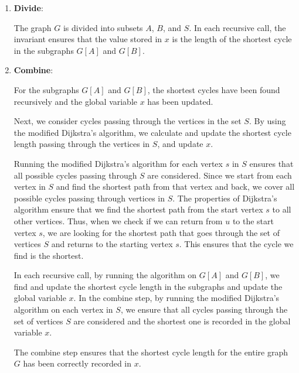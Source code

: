 \documentclass[12pt]{article}
\begin{document}
        \begin{enumerate}
            \item \textbf{Divide}:
            
            The graph \( G \) is divided into subsets \( A \), \( B \), and \( S \). In each recursive call, the invariant ensures that the value stored in \( x \) is the length of the shortest cycle in the subgraphs \( G[A] \) and \( G[B] \).

            \item \textbf{Combine}:
            
            For the subgraphs \( G[A] \) and \( G[B] \), the shortest cycles have been found recursively and the global variable \( x \) has been updated.
            
            Next, we consider cycles passing through the vertices in the set \( S \). By using the modified Dijkstra's algorithm, we calculate and update the shortest cycle length passing through the vertices in \( S \), and update \( x \).
            
            Running the modified Dijkstra's algorithm for each vertex \( s \) in \( S \) ensures that all possible cycles passing through \( S \) are considered. Since we start from each vertex in \( S \) and find the shortest path from that vertex and back, we cover all possible cycles passing through vertices in \( S \). The properties of Dijkstra's algorithm ensure that we find the shortest path from the start vertex \( s \) to all other vertices. Thus, when we check if we can return from \( u \) to the start vertex \( s \), we are looking for the shortest path that goes through the set of vertices \( S \) and returns to the starting vertex \( s \). This ensures that the cycle we find is the shortest.
            
            In each recursive call, by running the algorithm on \( G[A] \) and \( G[B] \), we find and update the shortest cycle length in the subgraphs and update the global variable \( x \). In the combine step, by running the modified Dijkstra's algorithm on each vertex in \( S \), we ensure that all cycles passing through the set of vertices \( S \) are considered and the shortest one is recorded in the global variable \( x \).
            
            The combine step ensures that the shortest cycle length for the entire graph \( G \) has been correctly recorded in \( x \).
            
        \end{enumerate}
\end{document}
